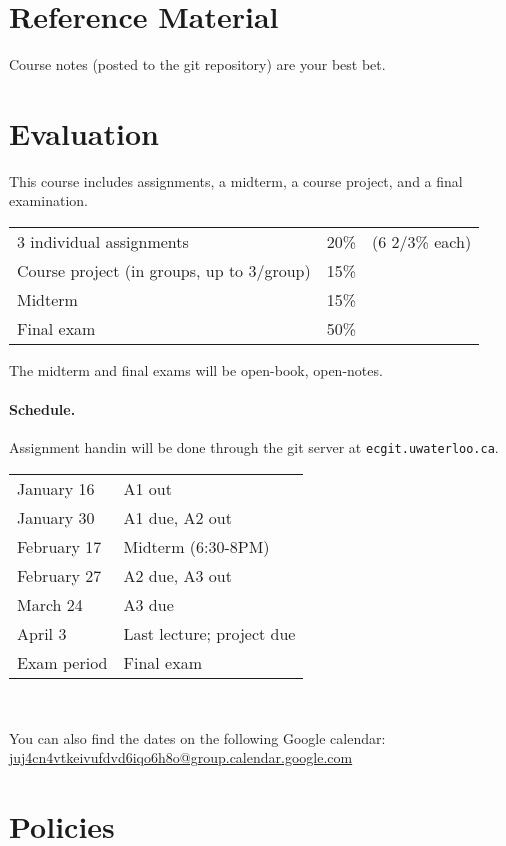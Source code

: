 \documentclass{article}
\begin{document}
\section*{Reference Material}
Course notes (posted to the git repository) are your best bet.

\newpage
\section*{Evaluation}
This course includes assignments, a midterm, a course project, and a final
examination.

\begin{tabular}{lrl}
3 individual assignments & 20\% & (6 2/3\% each) \\
Course project (in groups, up to 3/group) & 15\% \\
Midterm & 15\% \\
Final exam & 50\% \\
\end{tabular}

\noindent The midterm and final exams will be open-book, open-notes. 

\paragraph{Schedule.} Assignment handin will be done through the git server at {\tt ecgit.uwaterloo.ca}.\\[-1em]
\begin{center}
\begin{tabular}{ll}
January 16	&A1 out\\
January 30	&A1 due, A2 out\\
February 17 &Midterm (6:30-8PM)\\
February 27	&A2 due, A3 out\\
March 24	&A3 due\\
April 3 	&Last lecture; project due\\
Exam period	&Final exam
\end{tabular}~\\
\end{center}
You can also find the dates on the following Google calendar:\\
\hspace*{3em}\url{juj4cn4vtkeivufdvd6iqo6h8o@group.calendar.google.com}

\section*{Policies}
\end{document}
